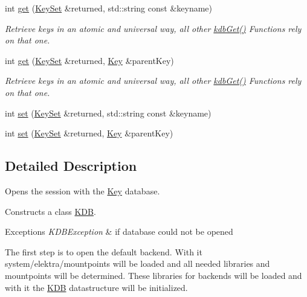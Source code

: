 \begin{DoxyCompactItemize}
int \hyperlink{classkdb_1_1KDB_a0419ffbc273c89756bc523b4223ec25a}{get} (\hyperlink{classkdb_1_1KeySet}{Key\-Set} \&returned, std\-::string const \&keyname)
\begin{DoxyCompactList}\small\item\em Retrieve keys in an atomic and universal way, all other \hyperlink{group__kdb_ga28e385fd9cb7ccfe0b2f1ed2f62453a1}{kdb\-Get()} Functions rely on that one.  \end{DoxyCompactList}\item 
int \hyperlink{classkdb_1_1KDB_a48770a7290699bf2b7529f3ab67e378f}{get} (\hyperlink{classkdb_1_1KeySet}{Key\-Set} \&returned, \hyperlink{classkdb_1_1Key}{Key} \&parent\-Key)
\begin{DoxyCompactList}\small\item\em Retrieve keys in an atomic and universal way, all other \hyperlink{group__kdb_ga28e385fd9cb7ccfe0b2f1ed2f62453a1}{kdb\-Get()} Functions rely on that one.  \end{DoxyCompactList}\item 
int \hyperlink{classkdb_1_1KDB_a29087a6a1a7de334f4e5b62ffe5d6e6e}{set} (\hyperlink{classkdb_1_1KeySet}{Key\-Set} \&returned, std\-::string const \&keyname)
\begin{DoxyCompactList}\small\item\em \end{DoxyCompactList}\item 
int \hyperlink{classkdb_1_1KDB_a62a4fafbe21d9519b31a7868aa05f3e3}{set} (\hyperlink{classkdb_1_1KeySet}{Key\-Set} \&returned, \hyperlink{classkdb_1_1Key}{Key} \&parent\-Key)
\begin{DoxyCompactList}\small\item\em \end{DoxyCompactList}\end{DoxyCompactItemize}


\subsection{Detailed Description}
Opens the session with the \hyperlink{classkdb_1_1Key}{Key} database.   

Constructs a class \hyperlink{classkdb_1_1KDB}{K\-D\-B}.


\begin{DoxyExceptions}{Exceptions}
{\em K\-D\-B\-Exception} & if database could not be opened\\
\hline
\end{DoxyExceptions}
The first step is to open the default backend. With it system/elektra/mountpoints will be loaded and all needed libraries and mountpoints will be determined. These libraries for backends will be loaded and with it the {\ttfamily \hyperlink{classkdb_1_1KDB}{K\-D\-B}} datastructure will be initialized.

